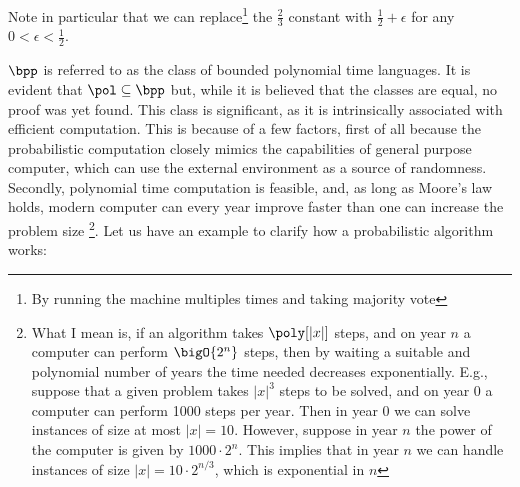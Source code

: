 \documentclass{article}
\begin{document}
Note in particular that we can replace\footnote{By running the machine multiples times and taking majority vote} the $\frac{2}{3}$ constant with $\frac{1}{2} + \epsilon$ for any $0 < \epsilon < \frac{1}{2}$.

$\bpp$ is referred to as the class of bounded polynomial time languages. It is evident that $\pol \subseteq \bpp$ but, while it is believed that the classes are equal, no proof was yet found. This class is significant, as it is intrinsically associated with efficient computation. This is because of a few factors, first of all because the probabilistic computation closely mimics the capabilities of general purpose computer, which can use the external environment as a source of randomness. Secondly, polynomial time computation is feasible, and, as long as Moore's law holds, modern computer can every year improve faster than one can increase the problem size
\footnote{What I mean is, if an algorithm takes $\poly[|x|]$ steps, and on year $n$ a computer can perform $\bigO{2^n}$ steps, then by waiting a suitable and polynomial number of years the time needed
    decreases exponentially. E.g., suppose that a given problem takes $|x|^3$ steps to be solved, and on year 0 a computer can
    perform 1000 steps per year. Then in year 0 we can solve instances of size at most $|x| = 10$. However, suppose in year $n$ the
    power of the computer is given by $1000 \cdot 2^n$. This implies that in year $n$ we can handle instances of size $|x| = 10 \cdot 2^{n/3} $, which is exponential in $n$}.
Let us have an example to clarify how a probabilistic algorithm works:
\end{document}
